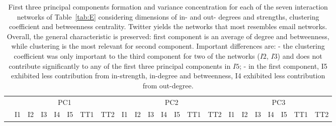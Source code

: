 \documentclass[%
 aip,
 jmp,%
 amsmath,amssymb,
 reprint,%
 floatfix,
]{revtex4-1}
\begin{document}
\begin{table}[!h]
	\caption{First three principal components formation and variance concentration for each of the seven interaction networks of Table~\ref{tab:E} considering dimensions of in- and out- degrees and strengths, clustering coefficient and betweenness centrality. Twitter yields the networks that most resembles email networks. Overall, the general characteristic is preserved: first component is an average of degree and betweenness, while clustering is the most relevant for second component. Important differences are: - the clustering coefficient was only important to the third component for two of the networks ($I2$, $I3$) and does not contribute significantly to any of the first three principal components in $I5$; - in the first component, I5 exhibited less contribution from in-strength, in-degree and betweenness, I4 exhibited less contribution from out-degree.}
	\footnotesize
\begin{center}
\begin{tabular}{| l ||  c |c |c |c |c | c | c || c | c | c | c | c | c | c || c |c |c |c |c | c | c |	}\cline{2-22}
\multicolumn{1}{c|}{} & \multicolumn{7}{c||}{PC1}          & \multicolumn{7}{c||}{PC2} & \multicolumn{7}{c|}{PC3}  \\\cline{2-22}
	\multicolumn{1}{c|}{} & 
	I1 & I2 & I3 & I4 & I5 & TT1 & TT2 &
	I1 & I2 & I3 & I4 & I5 & TT1 & TT2 &
	I1 & I2 & I3 & I4 & I5 & TT1 & TT2 \\\hline
	
\hline
\end{tabular}
\end{center}
\label{tab:pcaE2}
\end{table}
\end{document}

